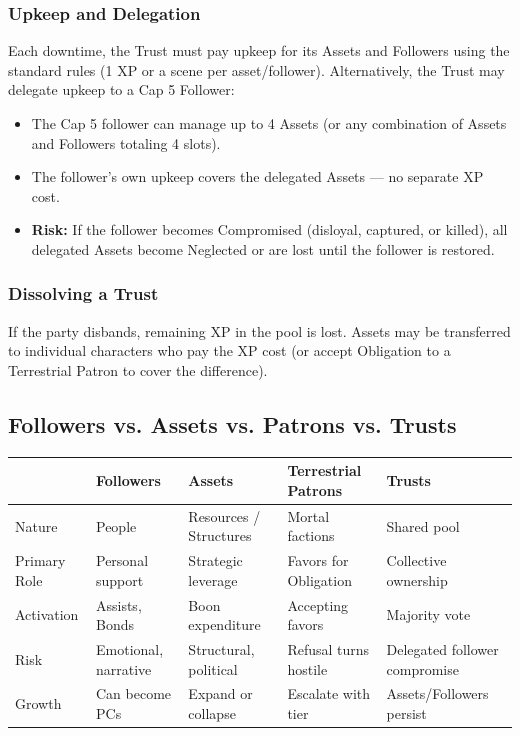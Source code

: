 \subsubsection{Upkeep and Delegation}
Each downtime, the Trust must pay upkeep for its Assets and Followers using the standard rules (1 XP or a scene per asset/follower). Alternatively, the Trust may delegate upkeep to a Cap 5 Follower:
\begin{itemize}
  \item The Cap 5 follower can manage up to 4 Assets (or any combination of Assets and Followers totaling 4 slots).
  \item The follower's own upkeep covers the delegated Assets --- no separate XP cost.
  \item \textbf{Risk:} If the follower becomes Compromised (disloyal, captured, or killed), all delegated Assets become Neglected or are lost until the follower is restored.
\end{itemize}

\subsubsection{Dissolving a Trust}
If the party disbands, remaining XP in the pool is lost. Assets may be transferred to individual characters who pay the XP cost (or accept Obligation to a Terrestrial Patron to cover the difference).

\subsection{Followers vs. Assets vs. Patrons vs. Trusts}

\begin{tabular}{@{}p{2.5cm}p{2.5cm}p{2.5cm}p{2.5cm}p{2.5cm}@{}}
\toprule
 & \textbf{Followers} & \textbf{Assets} & \textbf{Terrestrial Patrons} & \textbf{Trusts} \\
\midrule
Nature & People & Resources / Structures & Mortal factions & Shared pool \\
Primary Role & Personal support & Strategic leverage & Favors for Obligation & Collective ownership \\
Activation & Assists, Bonds & Boon expenditure & Accepting favors & Majority vote \\
Risk & Emotional, narrative & Structural, political & Refusal turns hostile & Delegated follower compromise \\
Growth & Can become PCs & Expand or collapse & Escalate with tier & Assets/Followers persist \\
\bottomrule
\end{tabular}


